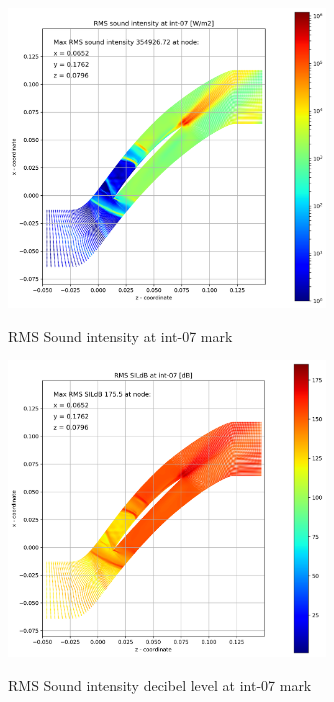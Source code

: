 \begin{figure}[ht]
  \centering
  \includegraphics[width=0.75\textwidth]{Figures/int-07-rms-sil.png} \label{int-07-rms-sil}
  \caption{RMS Sound intensity at int-07 mark}
  
  \vspace*{\floatsep}%

  \includegraphics[width=0.75\textwidth]{Figures/int-07-rms-sildb.png} \label{int-07-rms-sildb}
  \caption{RMS Sound intensity decibel level at int-07 mark}
\end{figure}


